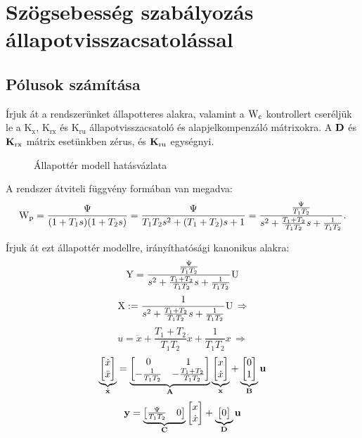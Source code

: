 \section{Szögsebesség szabályozás állapotvisszacsatolással}

\subsection{Pólusok számítása}

Írjuk át a rendszerünket állapotteres alakra, valamint a $\mathrm{W}_\text{c}$ kontrollert
cseréljük le a $\mathrm{K}_\text{x}$, $\mathrm{K}_\text{rx}$ és $\mathrm{K}_\text{ru}$ állapotvisszacsatoló és
alapjelkompenzáló mátrixokra.
A $\boldsymbol{\mathrm{D}}$ és $\boldsymbol{\mathrm{K}}_\text{rx}$ mátrix esetünkben zérus, és $\boldsymbol{\mathrm{K}}_\text{ru}$ egységnyi.

\begin{figure}[H]
    \centering
    \caption{Állapottér modell hatásvázlata}
    \label{fig:5a_allapotter_hatasvazlat}
\end{figure}

A rendszer átviteli függvény formában van megadva:
\begin{equation}
	\mathrm{W}_\text{p} = \frac{\Psi}{(1+T_1s)(1+T_2s)} = \frac{\Psi}{T_1T_2s^2+(T_1+T_2)s+1} = 
	\frac{\frac{\Psi}{T_1T_2}}{s^2+\frac{T_1+T_2}{T_1T_2}s+\frac{1}{T_1T_2}}.
\end{equation}

Írjuk át ezt állapottér modellre, irányíthatósági kanonikus alakra:
\begin{equation}
	\mathrm{Y} = \frac{\frac{\Psi}{T_1T_2}}{s^2+\frac{T_1+T_2}{T_1T_2}s+\frac{1}{T_1T_2}}\mathrm{U}
\end{equation}
\begin{equation}
	\mathrm{X} := \frac{1}{s^2+\frac{T_1+T_2}{T_1T_2}s+\frac{1}{T_1T_2}}\mathrm{U}\,\Rightarrow
\end{equation}
\begin{equation}
	u = \ddot{x} + \frac{T_1+T_2}{T_1T_2}\dot{x} + \frac{1}{T_1T_2}x\,\Rightarrow
\end{equation}
\begin{equation}
	\underbrace{\begin{bmatrix}\dot{x}\\\ddot{x} \end{bmatrix}}_{\dot{\boldsymbol{\mathrm{x}} }}
	= \underbrace{\begin{bmatrix}0&1\\-\frac{1}{T_1T_2}&-\frac{T_1+T_2}{T_1T_2} \end{bmatrix}}_{\boldsymbol{\mathrm{A}}}
	\underbrace{\begin{bmatrix}x\\\dot{x} \end{bmatrix}}_{\boldsymbol{\mathrm{x}}}
	+ \underbrace{\begin{bmatrix}0\\1\end{bmatrix}}_{\boldsymbol{\mathrm{B}}}\boldsymbol{\mathrm{u}}
\end{equation}
\begin{equation}
	\boldsymbol{\mathrm{y}} = \underbrace{\begin{bmatrix}\frac{\Psi}{T_1T_2}&0\end{bmatrix}}_{\boldsymbol{\mathrm{C}}}\begin{bmatrix}x\\\dot{x}\end{bmatrix} + \underbrace{\begin{bmatrix}0\end{bmatrix}}_{\boldsymbol{\mathrm{D}}}\boldsymbol{\mathrm{u}}
\end{equation}

